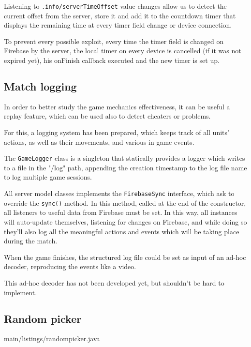 			Listening to \lstinline|.info/serverTimeOffset| value changes allow us to detect the current offset from the server, store it and add it to the countdown timer that displays the remaining time at every timer field change or device connection.
			
			To prevent every possible exploit, every time the timer field is changed on Firebase by the server, the local timer on every device is cancelled (if it was not expired yet), his onFinish callback executed and the new timer is set up.
		
		\subsection{Match logging}\label{focus:log}
		
			In order to better study the game mechanics effectiveness, it can be useful a replay feature, which can be used also to detect cheaters or problems.
			
			For this, a logging system has been prepared, which keeps track of all units' actions, as well as their movements, and various in-game events.
			
			The \lstinline|GameLogger| class is a singleton that statically provides a logger which writes to a file in the "/log" path, appending the creation timestamp to the log file name to log multiple game sessions.
			
			All server model classes implements the \lstinline|FirebaseSync| interface, which ask to override the \lstinline|sync()| method.
			In this method, called at the end of the constructor, all listeners to useful data from Firebase must be set.
			In this way, all instances will auto-update themselves, listening for changes on Firebase, and while doing so they'll also log all the meaningful actions and events which will be taking place during the match.
			
			When the game finishes, the structured log file could be set as input of an ad-hoc decoder, reproducing the events like a video.
			
			This ad-hoc decoder has not been developed yet, but shouldn't be hard to implement. 
		
		\subsection{Random picker}\label{focus:picker}
		
			
							{main/listings/randompicker.java}
			
